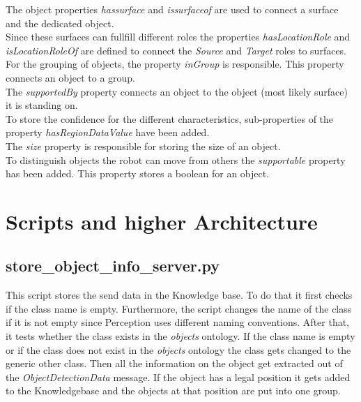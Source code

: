\documentclass[main.tex]{subfiles}
\begin{document}
The object properties \textit{hassurface} and \textit{issurfaceof} are used to connect a surface and the dedicated object.\\
Since these surfaces can fullfill different roles the properties \textit{hasLocationRole} and \textit{isLocationRoleOf} are defined to connect the \textit{Source} and \textit{Target} roles to surfaces.\\
For the grouping of objects, the property \textit{inGroup} is responsible. This property connects an object to a group.\\
The \textit{supportedBy} property connects an object to the object (most likely surface) it is standing on.\\
To store the confidence for the different characteristics, sub-properties of the property \textit{hasRegionDataValue} have been added.\\
The \textit{size} property is responsible for storing the size of an object.\\
To distinguish objects the robot can move from others the \textit{supportable} property has been added. This property stores a boolean for an object.



\section{Scripts and higher Architecture}
\subsection{store\_object\_info\_server.py}
This script stores the send data in the Knowledge base.
To do that it first checks if the class name is empty. Furthermore, the script changes the name of the class if it is not empty since Perception uses different naming conventions. After that, it tests whether the class exists in the \textit{objects} ontology. If the class name is empty or if the class does not exist in the \textit{objects} ontology the class gets changed to the generic other class. Then all the information on the object get extracted out of the \textit{ObjectDetectionData} message. If the object has a legal position it gets added to the Knowledgebase and the objects at that position are put into one group.

	\endgroup
\end{document}
